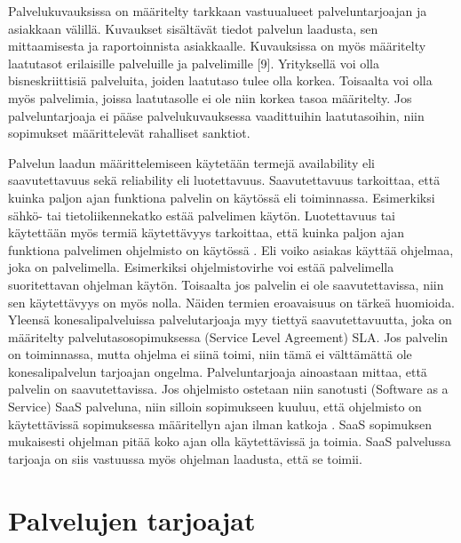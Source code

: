 Palvelukuvauksissa on määritelty tarkkaan vastuualueet palveluntarjoajan ja asiakkaan välillä. Kuvaukset sisältävät tiedot palvelun laadusta, sen mittaamisesta ja raportoinnista asiakkaalle. Kuvauksissa on myös määritelty laatutasot erilaisille palveluille ja palvelimille [9]. Yrityksellä voi olla bisneskriittisiä palveluita, joiden laatutaso tulee olla korkea. Toisaalta voi olla myös palvelimia, joissa laatutasolle ei ole niin korkea tasoa määritelty. Jos palveluntarjoaja ei pääse palvelukuvauksessa vaadittuihin laatutasoihin, niin sopimukset määrittelevät rahalliset sanktiot.

Palvelun laadun määrittelemiseen käytetään termejä availability eli saavutettavuus sekä reliability eli luotettavuus. Saavutettavuus tarkoittaa, että kuinka paljon ajan funktiona palvelin on käytössä eli toiminnassa. Esimerkiksi sähkö- tai tietoliikennekatko estää palvelimen käytön. Luotettavuus tai käytettään myös termiä käytettävyys tarkoittaa, että kuinka paljon ajan funktiona palvelimen ohjelmisto on käytössä \citep{service_availability} \citep{itil}. Eli voiko asiakas käyttää ohjelmaa, joka on palvelimella. Esimerkiksi ohjelmistovirhe voi estää palvelimella suoritettavan ohjelman käytön. Toisaalta jos palvelin ei ole saavutettavissa, niin sen käytettävyys on myös nolla. Näiden termien eroavaisuus on tärkeä huomioida. Yleensä konesalipalveluissa palvelutarjoaja myy tiettyä saavutettavuutta, joka on määritelty palvelutasosopimuksessa (Service Level Agreement) SLA. Jos palvelin on toiminnassa, mutta ohjelma ei siinä toimi, niin tämä ei välttämättä ole konesalipalvelun tarjoajan ongelma. Palveluntarjoaja ainoastaan mittaa, että palvelin on saavutettavissa. Jos ohjelmisto ostetaan niin sanotusti (Software as a Service) SaaS palveluna, niin silloin sopimukseen kuuluu, että ohjelmisto on käytettävissä sopimuksessa määritellyn ajan ilman katkoja \citep{software_service}. SaaS sopimuksen mukaisesti ohjelman pitää koko ajan olla käytettävissä ja toimia. SaaS palvelussa tarjoaja on siis vastuussa myös ohjelman laadusta, että se toimii.

\section{Palvelujen tarjoajat}